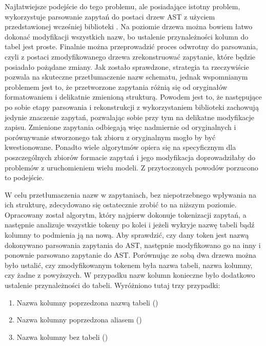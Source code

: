 Najłatwiejsze podejście do tego problemu, ale posiadające istotny problem, wykorzystuje parsowanie zapytań do postaci drzew AST z użyciem przedstawionej wcześniej biblioteki . Na poziomie drzewa można bowiem łatwo dokonać modyfikacji wszystkich nazw, bo ustalenie przynależności kolumn do tabel jest proste. Finalnie można przeprowadzić proces odwrotny do parsowania, czyli z postaci zmodyfikowanego drzewa zrekonstruować zapytanie, które będzie posiadało pożądane zmiany. Jak zostało sprawdzone, strategia ta rzeczywiście pozwala na skuteczne przetłumaczenie nazw schematu, jednak wspomnianym problemem jest to, że przetworzone zapytania różnią się od oryginałów formatowaniem i delikatnie zmienioną strukturą. Powodem jest to, że następujące po sobie etapy parsowania i rekonstrukcji z wykorzystaniem biblioteki  zachowują jedynie znaczenie zapytań, pozwalając sobie przy tym na delikatne modyfikacje zapisu. Zmienione zapytania odbiegają więc nadmiernie od oryginalnych i porównywanie stworzonego tak zbioru z oryginalnym mogło by być kwestionowane. Ponadto wiele algorytmów opiera się na specyficznym dla poszczególnych zbiorów formacie zapytań i jego modyfikacja doprowadziłaby do problemów z uruchomieniem wielu modeli. Z przytoczonych powodów porzucono to podejście.

W celu przetłumaczenia nazw w zapytaniach, bez niepotrzebnego wpływania na ich strukturę, zdecydowano się ostatecznie zrobić to na niższym poziomie. Opracowany został algorytm, który najpierw dokonuje tokenizacji zapytań, a następnie analizuje wszystkie tokeny po kolei i jeżeli wykryje nazwę tabeli bądź kolumny to podmienia ją na nową. Aby sprawdzić, czy dany token jest nazwą dokonywano parsowania zapytania do AST, następnie modyfikowano go na inny i ponownie parsowano zapytanie do AST. Porównując ze sobą dwa drzewa można było ustalić, czy zmodyfikowanym tokenem była nazwa tabeli, nazwa kolumny, czy żadne z powyższych. W przypadku nazw kolumn konieczne było dodatkowo ustalenie przynależności do tabeli. Wyróżniono tutaj trzy przypadki:

\begin{enumerate}
    \item Nazwa kolumny poprzedzona nazwą tabeli ()
    \item Nazwa kolumny poprzedzona aliasem ()
    \item Nazwa kolumny bez tabeli ()
\end{enumerate}

